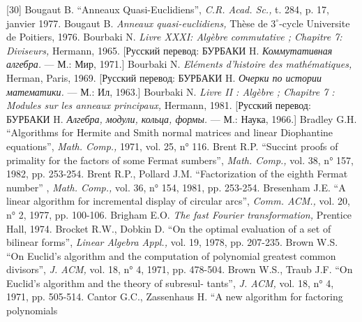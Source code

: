 \documentclass{../../template/mai_book}
\begin{document}
[30] Bougaut B. “Anneaux Quasi-Euclidiens”, {\itshape C.R. Acad. Sc.,} t. 284, p. 17, janvier 1977. \newline
[31] Bougaut B. {\itshape Anneaux quasi-euclidiens,} Th\`{e}se de $3^{\circ}$-cycle Universite de Poitiers, 1976. \newline
[32] Bourbaki N. {\itshape Livre XXXI: Alg\`{e}bre commutative ; Chapitre 7: Diviseurs,} Hermann, 1965. [Русский перевод: БУРБАКИ H. {\itshape Коммутативная алгебра.} — М.: Мир, 1971.] \newline
[33] Bourbaki N. {\itshape El\'{e}ments d’histoire des math\'{e}matiques,} Herman, Paris, 1969. [Русский перевод: БУРБАКИ H. {\itshape Очерки по истории математики.} — М.: Ил, 1963.] \newline
[34] Bourbaki N. {\itshape Livre II : Alg\`{e}bre ; Chapitre 7 : Modules sur les anneaux principaux,} Hermann, 1981. [Русский перевод: БУРБАКИ H. {\itshape Алгебра, модули, кольца, формы.} — М.: Наука, 1966.] \newline
[35] Bradley G.H. “Algorithms for Hermite and Smith normal matrices and
linear Diophantine equations”, {\itshape Math. Comp.,} 1971, vol. 25, n° 116. \newline
\newpage
\noindent
[36] Brent R.P. “Succint proofs of primality for the factors of some Fermat sumbers”, {\itshape Math. Comp.,} vol. 38, n° 157, 1982, pp. 253-254. \newline
[37] Brent R.P., Pollard J.M. “Factorization of the eighth Fermat number”
, {\itshape Math. Comp.,} vol. 36, n° 154, 1981, pp. 253-254. \newline
[38] Bresenham J.E. “A linear algorithm for incremental display of circular arcs”, {\itshape Comm. ACM.,} vol. 20, n° 2, 1977, pp. 100-106. \newline
[39] Brigham E.O. {\itshape The fast Fourier transformation,} Prentice Hall, 1974. \newline
[40] Brocket R.W., Dobkin D. “On the optimal evaluation of a set of
bilinear forms”, {\itshape Linear Algebra Appl.,} vol. 19, 1978, pp. 207-235. \newline
[41] Brown W.S. “On Euclid’s algorithm and the computation of polynomial
greatest common divisors”, {\itshape J. ACM,} vol. 18, n° 4, 1971, pp. 478-504. \newline
[42] Brown W.S., Traub J.F. “On Euclid’s algorithm and the theory of
subresul- \newline tants”, {\itshape J. ACM,} vol. 18, n° 4, 1971, pp. 505-514. \newline
[43] Cantor G.C., Zassenhaus H. “A new algorithm for factoring polynomials
\end{document}
